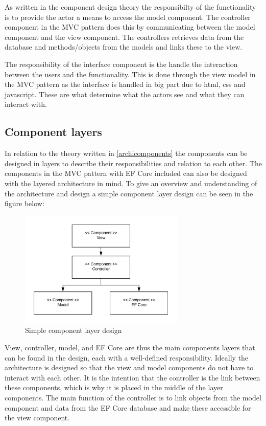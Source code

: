 As written in the component design theory the responsibilty of the functionality is to provide the actor a means to access the model component.
The controller component in the MVC pattern does this by communicating between the model component and the view component.
The controllers retrieves data from the database and methods/objects from the models and links these to the view.

The responsibility of the interface component is the handle the interaction between the users and the functionality.
This is done through the view model in the MVC pattern as the interface is handled in big part due to html, css and javascript.
These are what determine what the actors see and what they can interact with.

\subsection{Component layers}
In relation to the theory written in \cref{archicomponents} the components can be designed in layers to describe their responsibilities and relation to each other.
The components in the MVC pattern with EF Core included can also be designed with the layered architecture in mind.
To give an overview and understanding of the architecture and design a simple component layer design can be seen in the figure below:

\begin{figure}[H]
	\centering
	\includegraphics[width=0.7\textwidth]{billeder/simplecomponents.jpeg}
	\caption{Simple component layer design}
\end{figure}


View, controller, model, and EF Core are thus the main components layers that can be found in the design, each with a well-defined responsibility.
Ideally the architecture is designed so that the view and model components do not have to interact with each other.
It is the intention that the controller is the link between these components, which is why it is placed in the middle of the layer components.
The main function of the controller is to link objects from the model component and data from the EF Core database and make these accessible for the view component.

